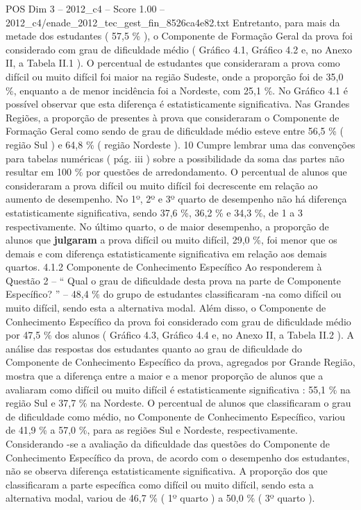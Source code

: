 \begin{textsample}{POS Dim 3 – 2012\_c4 – Score 1.00 – 2012\_c4/enade\_2012\_tec\_gest\_fin\_8526ca4e82.txt}
Entretanto, para mais da metade dos estudantes ( 57,5 \% ), o Componente de Formação Geral da prova foi considerado com grau de dificuldade médio ( Gráfico 4.1, Gráfico 4.2 e, no Anexo II, a Tabela II.1 ).
O percentual de estudantes que consideraram a prova como difícil ou muito difícil foi maior na região Sudeste, onde a proporção foi de 35,0 \%, enquanto a de menor incidência foi a Nordeste, com 25,1 \%.
No Gráfico 4.1 é possível observar que esta diferença é estatisticamente significativa.
Nas Grandes Regiões, a proporção de presentes à prova que consideraram o Componente de Formação Geral como sendo de grau de dificuldade médio esteve entre 56,5 \% ( região Sul ) e 64,8 \% ( região Nordeste ). 10 Cumpre lembrar uma das convenções para tabelas numéricas ( pág. iii ) sobre a possibilidade da soma das partes não resultar em 100 \% por questões de arredondamento.
O percentual de alunos que consideraram a prova difícil ou muito difícil foi decrescente em relação ao aumento de desempenho.
No 1º, 2º e 3º quarto de desempenho não há diferença estatisticamente significativa, sendo 37,6 \%, 36,2 \% e 34,3 \%, de 1 a 3 respectivamente.
No último quarto, o de maior desempenho, a proporção de alunos que \textbf{julgaram} a prova difícil ou muito difícil, 29,0 \%, foi menor que os demais e com diferença estatisticamente significativa em relação aos demais quartos. 4.1.2 Componente de Conhecimento Específico Ao responderem à Questão 2 – “ Qual o grau de dificuldade desta prova na parte de Componente Específico? ” – 48,4 \% do grupo de estudantes classificaram -na como difícil ou muito difícil, sendo esta a alternativa modal.
Além disso, o Componente de Conhecimento Específico da prova foi considerado com grau de dificuldade médio por 47,5 \% dos alunos ( Gráfico 4.3, Gráfico 4.4 e, no Anexo II, a Tabela II.2 ).
A análise das respostas dos estudantes quanto ao grau de dificuldade do Componente de Conhecimento Específico da prova, agregados por Grande Região, mostra que a diferença entre a maior e a menor proporção de alunos que a avaliaram como difícil ou muito difícil é estatisticamente significativa : 55,1 \% na região Sul e 37,7 \% na Nordeste.
O percentual de alunos que classificaram o grau de dificuldade como médio, no Componente de Conhecimento Específico, variou de 41,9 \% a 57,0 \%, para as regiões Sul e Nordeste, respectivamente.
Considerando -se a avaliação da dificuldade das questões do Componente de Conhecimento Específico da prova, de acordo com o desempenho dos estudantes, não se observa diferença estatisticamente significativa.
A proporção dos que classificaram a parte específica como difícil ou muito difícil, sendo esta a alternativa modal, variou de 46,7 \% ( 1º quarto ) a 50,0 \% ( 3º quarto ).

\end{textsample}
